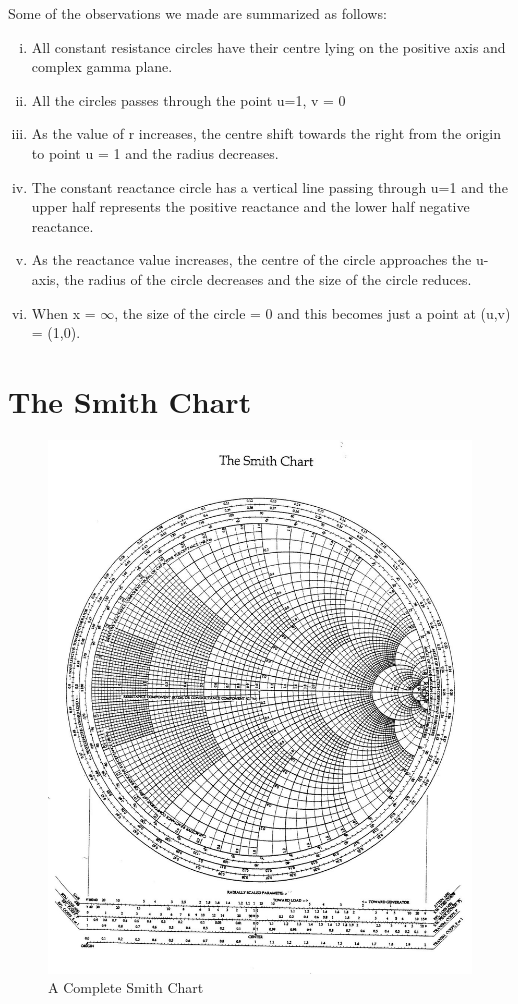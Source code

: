Some of the observations we made are summarized as follows:
\begin{enumerate}[(i)]
\item All constant resistance circles have their centre lying on the positive axis and complex gamma plane.
\item All the circles passes through the point u=1, v = 0
\item As the value of r increases, the centre shift towards the right from the origin to point u = 1 and the radius decreases.
\item The constant reactance circle has a vertical line passing through u=1 and the upper half represents the positive reactance and the lower half negative reactance.
\item As the reactance value increases, the centre of the circle approaches the u-axis, the radius of the circle decreases and the size of the circle reduces.
\item When x = $\infty$, the size of the circle = 0  and this  becomes just a point at (u,v) = (1,0).
\end{enumerate}

\section{The Smith Chart}
\begin{figure}[h]
\centering
\includegraphics[width=0.7\linewidth]{"./graphics/smith_chart (2)"}
\caption{A Complete Smith Chart}
\label{fig:smithchart-2}
\end{figure}

